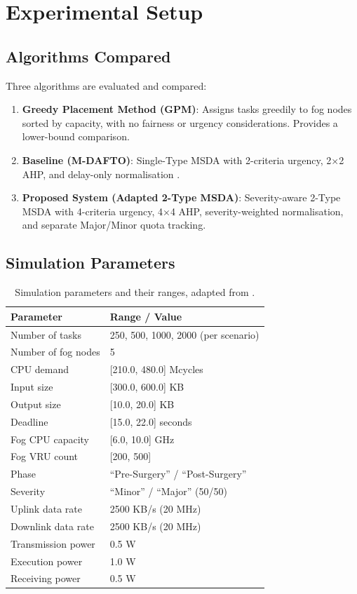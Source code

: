 \section{Experimental Setup}

\subsection{Algorithms Compared}

Three algorithms are evaluated and compared:
\begin{enumerate}
\item \textbf{Greedy Placement Method (GPM)}: Assigns tasks greedily to fog nodes sorted by capacity, with no fairness or urgency considerations. Provides a lower-bound comparison.
\item \textbf{Baseline (M-DAFTO)}: Single-Type MSDA with 2-criteria urgency, 2$\times$2 AHP, and delay-only normalisation \cite{swain2024mdafto}.
\item \textbf{Proposed System (Adapted 2-Type MSDA)}: Severity-aware 2-Type MSDA with 4-criteria urgency, 4$\times$4 AHP, severity-weighted normalisation, and separate Major/Minor quota tracking.
\end{enumerate}

\subsection{Simulation Parameters}

\begin{table}[htbp]
\centering
\begin{tabular}{|l|l|}
\hline
\textbf{Parameter} & \textbf{Range / Value} \\
\hline
Number of tasks & 250, 500, 1000, 2000 (per scenario) \\
Number of fog nodes & 5 \\
CPU demand & [210.0, 480.0] Mcycles \\
Input size & [300.0, 600.0] KB \\
Output size & [10.0, 20.0] KB \\
Deadline & [15.0, 22.0] seconds \\
Fog CPU capacity & [6.0, 10.0] GHz \\
Fog VRU count & [200, 500] \\
Phase & ``Pre-Surgery'' / ``Post-Surgery'' \\
Severity & ``Minor'' / ``Major'' (50/50) \\
Uplink data rate & 2500 KB/s (20 MHz) \\
Downlink data rate & 2500 KB/s (20 MHz) \\
Transmission power & 0.5 W \\
Execution power & 1.0 W \\
Receiving power & 0.5 W \\
\hline
\end{tabular}
\caption{Simulation parameters and their ranges, adapted from \cite{swain2024mdafto}.}
\label{tab:sim_params}
\end{table}

